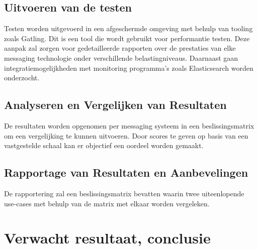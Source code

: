\subsection{Uitvoeren van de testen}
Testen worden uitgevoerd in een afgeschermde omgeving met behulp van tooling zoals Gatling.
Dit is een tool die wordt gebruikt voor performantie testen.
Deze aanpak zal zorgen voor gedetailleerde rapporten over de prestaties van elke messaging technologie onder verschillende belastingniveaus. 
Daarnaast gaan integratiemogelijkheden met monitoring programma's zoals Elasticsearch worden onderzocht.

\subsection{Analyseren en Vergelijken van Resultaten}
De resultaten worden opgenomen per messaging systeem in een beslissingsmatrix om een vergelijking te kunnen uitvoeren. 
Door scores te geven op basis van een vastgestelde schaal kan er objectief een oordeel worden gemaakt.

\subsection{Rapportage van Resultaten en Aanbevelingen}
De rapportering zal een beslissingsmatrix bevatten waarin twee uiteenlopende use-cases met behulp van de 
matrix met elkaar worden vergeleken.

\section{Verwacht resultaat, conclusie}%

\label{sec:verwachte-resultaten}




